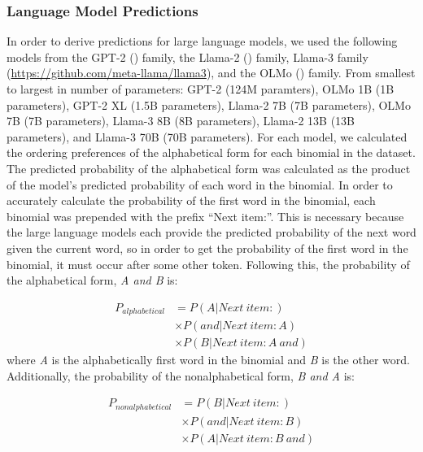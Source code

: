 \documentclass[
  12pt,
  letterpaper,
]{scrreprt}
\begin{document}
\subsubsection{Language Model
Predictions}\label{language-model-predictions}

In order to derive predictions for large language models, we used the
following models from the GPT-2
()
family, the Llama-2 () family, Llama-3 family
(\hyperref[0]{https://github.com/meta-llama/llama3}), and the OLMo
() family. From smallest to largest in number of parameters: GPT-2
(124M paramters), OLMo 1B (1B parameters), GPT-2 XL (1.5B parameters),
Llama-2 7B (7B parameters), OLMo 7B (7B parameters), Llama-3 8B (8B
parameters), Llama-2 13B (13B parameters), and Llama-3 70B (70B
parameters). For each model, we calculated the ordering preferences of
the alphabetical form for each binomial in the dataset. The predicted
probability of the alphabetical form was calculated as the product of
the model's predicted probability of each word in the binomial. In order
to accurately calculate the probability of the first word in the
binomial, each binomial was prepended with the prefix ``Next item:''.
This is necessary because the large language models each provide the
predicted probability of the next word given the current word, so in
order to get the probability of the first word in the binomial, it must
occur after some other token. Following this, the probability of the
alphabetical form, \emph{A and B} is:

\[
\begin{aligned}
    P_{alphabetical} & = P(A|Next\:item: )\\
      & \times P(and|Next\:item: A)\\
      & \times P(B|Next\:item: A\: and)
\end{aligned}
\] \noindent where \emph{A} is the alphabetically first word in the
binomial and \emph{B} is the other word. Additionally, the probability
of the nonalphabetical form, \emph{B and A} is:

\[
\begin{aligned}
    P_{nonalphabetical} & = P(B|Next\:item: )\\
      & \times P(and|Next\:item: B)\\
      & \times P(A|Next\:item: B\: and)
\end{aligned}
\]
\end{document}
